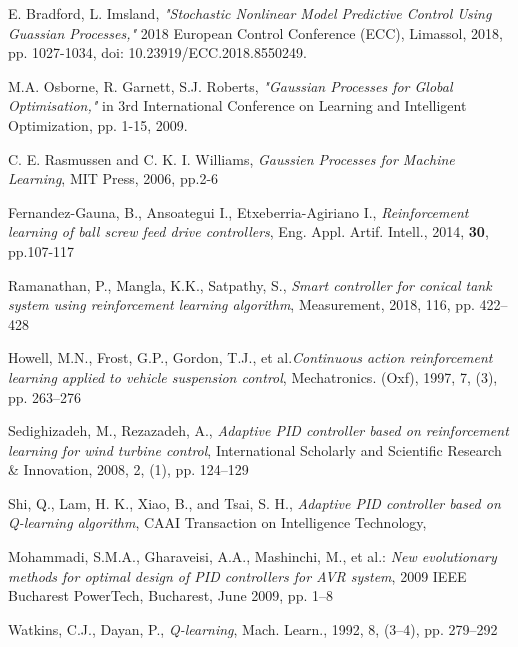 \documentclass[conference]{IEEEtran}
\theoremstyle{definition}
\begin{document}
\begin{thebibliography}{1}
E. Bradford, L. Imsland, \emph{"Stochastic Nonlinear Model Predictive Control Using Guassian Processes,"} 2018 European Control Conference (ECC), Limassol, 2018, pp. 1027-1034, doi: 10.23919/ECC.2018.8550249.

M.A. Osborne, R. Garnett, S.J. Roberts, \emph{"Gaussian Processes for Global Optimisation,"} in 3rd International Conference on Learning and Intelligent Optimization, pp. 1-15, 2009.

C. E. Rasmussen and C. K. I. Williams, \emph{Gaussien Processes for Machine Learning}, MIT Press, 2006, pp.2-6





Fernandez-Gauna, B., Ansoategui I., Etxeberria-Agiriano I., \emph{Reinforcement learning of ball screw feed drive controllers}, Eng. Appl. Artif. Intell., 2014, \textbf{30}, pp.107-117

Ramanathan, P., Mangla, K.K., Satpathy, S., \emph{Smart controller for conical tank system using reinforcement learning algorithm}, Measurement, 2018, 116, pp. 422–428

Howell, M.N., Frost, G.P., Gordon, T.J., et al.\emph{Continuous action reinforcement learning applied to vehicle suspension control}, Mechatronics. (Oxf), 1997, 7, (3), pp. 263–276

Sedighizadeh, M., Rezazadeh, A., \emph{Adaptive PID controller based on reinforcement learning for wind turbine control}, International Scholarly and
Scientific Research \& Innovation, 2008, 2, (1), pp. 124–129

Shi, Q., Lam, H. K., Xiao, B., and Tsai, S. H., \emph{Adaptive PID controller based on Q-learning algorithm}, CAAI Transaction on Intelligence Technology, 

Mohammadi, S.M.A., Gharaveisi, A.A., Mashinchi, M., et al.: \emph{New evolutionary methods for optimal design of PID controllers for AVR system}, 2009 IEEE Bucharest PowerTech, Bucharest, June 2009, pp. 1–8

Watkins, C.J., Dayan, P., \emph{Q-learning}, Mach. Learn., 1992, 8, (3–4), pp. 279–292




\end{thebibliography}
\end{document}

